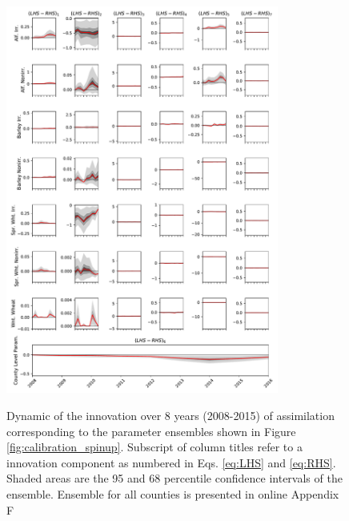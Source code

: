 \begin{figure}
\includegraphics[width=0.8\textwidth]{Figures/figure_Beaverhead.pdf}
\label{fig:innovation20082015}
\caption{Dynamic of the innovation over 8 years (2008-2015) of assimilation corresponding to the parameter ensembles shown in Figure \ref{fig:calibration_spinup}. Subscript of column titles refer to a innovation component as numbered in Eqs. \eqref{eq:LHS} and \eqref{eq:RHS}. Shaded areas are the 95 and 68 percentile confidence intervals of the ensemble. Ensemble for all counties is presented in online Appendix F}
\end{figure}




